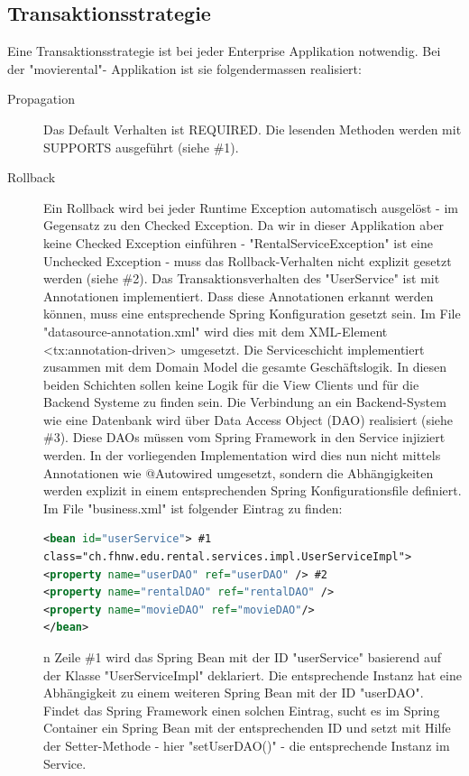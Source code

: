 \documentclass[a4paper,10pt]{scrreprt}
\begin{document}
\subsection{Transaktionsstrategie}
Eine Transaktionsstrategie ist bei jeder Enterprise Applikation notwendig. Bei der "movierental"-
Applikation ist sie folgendermassen realisiert:
\begin{description}
 \item [Propagation]Das Default Verhalten ist REQUIRED. Die lesenden Methoden werden mit SUPPORTS
ausgeführt (siehe \#1).
\item[Rollback]Ein Rollback wird bei jeder Runtime Exception automatisch ausgelöst - im Gegensatz zu den
Checked Exception. Da wir in dieser Applikation aber keine Checked Exception einführen -
"RentalServiceException" ist eine Unchecked Exception - muss das Rollback-Verhalten nicht
explizit gesetzt werden (siehe \#2).
Das Transaktionsverhalten des "UserService" ist mit Annotationen implementiert. Dass diese
Annotationen erkannt werden können, muss eine entsprechende Spring Konfiguration gesetzt sein.
Im File "datasource-annotation.xml" wird dies mit dem XML-Element <tx:annotation-driven>
umgesetzt.
Die Serviceschicht implementiert zusammen mit dem Domain Model die gesamte Geschäftslogik. In
diesen beiden Schichten sollen keine Logik für die View Clients und für die Backend Systeme zu
finden sein.
Die Verbindung an ein Backend-System wie eine Datenbank wird über Data Access Object (DAO)
realisiert (siehe \#3). Diese DAOs müssen vom Spring Framework in den Service injiziert werden. In
der vorliegenden Implementation wird dies nun nicht mittels Annotationen wie @Autowired
umgesetzt, sondern die Abhängigkeiten werden explizit in einem entsprechenden Spring
Konfigurationsfile definiert. Im File "business.xml" ist folgender Eintrag zu finden:
\begin{lstlisting}[language=xml]
 <bean id="userService"> #1
class="ch.fhnw.edu.rental.services.impl.UserServiceImpl">
<property name="userDAO" ref="userDAO" /> #2
<property name="rentalDAO" ref="rentalDAO" />
<property name="movieDAO" ref="movieDAO"/>
</bean>
\end{lstlisting}
n Zeile \#1 wird das Spring Bean mit der ID "userService" basierend auf der Klasse
"UserServiceImpl" deklariert. Die entsprechende Instanz hat eine Abhängigkeit zu einem weiteren
Spring Bean mit der ID "userDAO". Findet das Spring Framework einen solchen Eintrag, sucht es im
Spring Container ein Spring Bean mit der entsprechenden ID und setzt mit Hilfe der Setter-Methode
- hier "setUserDAO()" - die entsprechende Instanz im Service.
 
\end{description}
\end{document}
